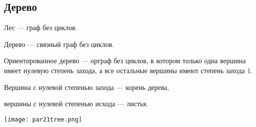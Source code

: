 \subsection{Дерево}

\begin{defn}
    Лес --- граф без циклов.
\end{defn}

\begin{defn}
    Дерево --- связный граф без циклов.
\end{defn}

\begin{defn}
    Ориентированное дерево --- орграф без циклов, в котором только одна вершина имеет нулевую степень захода, а все остальные вершины имеют степень захода $1$.
\end{defn}

Вершина с нулевой степенью захода --- корень дерева, 

вершины с нулевой степенью исхода --- листья.

\begin{center}
    \texttt{[image: par21tree.png]}
\end{center}